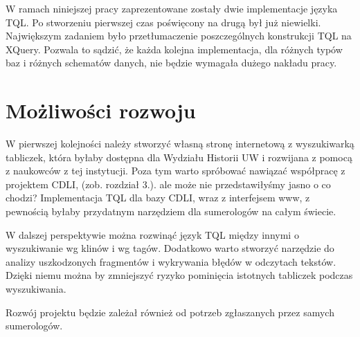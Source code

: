 W ramach niniejszej pracy zaprezentowane zostały dwie implementacje języka TQL. 
Po stworzeniu pierwszej czas poświęcony na drugą był już niewielki. 
Największym zadaniem było przetłumaczenie poszczególnych konstrukcji TQL na XQuery. 
Pozwala to sądzić, że każda kolejna implementacja, dla różnych typów baz i różnych schematów danych, 
nie będzie wymagała dużego nakładu pracy. 



\section*{Możliwości rozwoju}
W pierwszej kolejności należy stworzyć własną stronę internetową z wyszukiwarką tabliczek, 
która byłaby dostępna dla Wydziału Historii UW i rozwijana z pomocą z naukowców z tej instytucji. 
Poza tym warto spróbować nawiązać współpracę z projektem CDLI, (zob. rozdział 3.).
ale może nie przedstawiłyśmy jasno o co chodzi?
Implementacja TQL dla bazy CDLI, wraz z interfejsem www, z pewnością byłaby przydatnym narzędziem dla sumerologów na całym świecie.

W dalszej perspektywie można rozwinąć język TQL między innymi o wyszukiwanie wg klinów i wg tagów.
Dodatkowo warto stworzyć narzędzie do analizy uszkodzonych fragmentów i wykrywania błędów w odczytach tekstów. 
Dzięki niemu można by zmniejszyć ryzyko pominięcia istotnych tabliczek podczas wyszukiwania. 

Rozwój projektu będzie zależał również od potrzeb zgłaszanych przez samych sumerologów.





